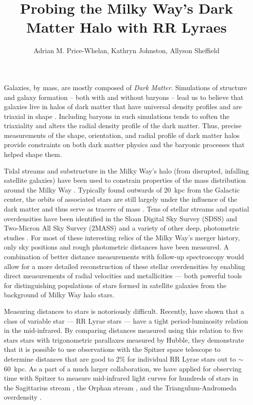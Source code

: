 \documentclass[preprint]{aastex}
\begin{document}
\title{Probing the Milky Way's Dark Matter Halo with RR Lyraes} \author{Adrian M.
  Price-Whelan, Kathryn Johnston,
  Allyson Sheffield} 

Galaxies, by mass, are mostly composed of \emph{Dark
  Matter}. Simulations of structure and galaxy formation -- both with
and without baryons -- lead us to believe that galaxies live in halos of
dark matter that have universal density profiles \citep{nfw96} and are
triaxial in shape \citep{jing02}. Including baryons in such
simulations tends to soften the triaxiality and alters the radial
density profile of the dark matter. Thus, precise measurements of the 
shape, orientation, and radial profile of dark matter halos provide 
constraints on both dark matter physics and the baryonic processes 
that helped shape them. 

Tidal streams and substructure in the Milky Way's 
halo (from disrupted, infalling satellite galaxies) have been used
to constrain properties of the mass distribution around the Milky Way \citep[e.g.,][]{law10}.
Typically found outwards of 20~kpc from the Galactic center, the orbits 
of associated stars are still largely under the influence of the dark matter 
and thus serve as tracers of mass \citep[e.g.,][]{johnston99, pricewhelan13}. 
Tens of stellar 
streams and spatial overdensities have been identified in the Sloan
Digital Sky Survey (SDSS) and Two-Micron All Sky Survey (2MASS)
and a variety of other deep, photometric studies \citep[e.g.,][]{majewski03,belokurov06}. 
For most of these interesting relics of the Milky Way's merger history, 
only sky positions and rough photometric distances have been measured. 
A combination of better distance measurements with follow-up spectroscopy
would allow for a more detailed reconstruction of these stellar overdensities 
by enabling direct measurements of radial velocities and metallicities --- 
both powerful tools for distinguishing populations of stars formed in satellite 
galaxies from the background of Milky Way halo stars.

Measuring distances to stars is notoriously difficult. Recently, \citet{madore12}
have shown that a class of variable star --- RR Lyrae stars --- have a 
tight period-luminosity relation in the mid-infrared. By comparing distances
measured using this relation to five stars stars with trigonometric parallaxes 
measured by Hubble, they demonstrate that it is possible to use observations with
the Spitzer space telescope to determine distances that are good to 2\% for individual RR Lyrae 
stars out to $\sim$60~kpc. As a part of a much
larger collaboration, we have applied for observing time with Spitzer to measure
mid-infrared light curves for hundreds of stars in the Sagittarius stream \citep[Sgr;][]{majewski03},
the Orphan stream \citep[Orp;][]{belokurov07}, and the Triangulum-Andromeda 
overdensity \citep[TriAnd;][]{rochapinto04}.
\end{document}
